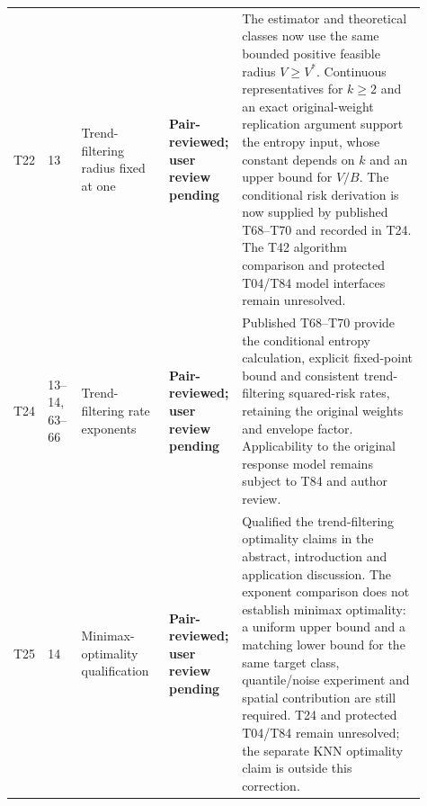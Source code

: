 \documentclass[10pt]{article}
\newcommand{\deferred}{\textcolor{deferredred}{\textbf{Deferred}}}
\newcommand{\pairreviewed}{\textcolor{deferredred}{\textbf{Pair-reviewed; user review pending}}}
\begin{document}
\begin{landscape}
\begin{longtable}{L{0.045\linewidth}L{0.08\linewidth}L{0.21\linewidth}L{0.13\linewidth}L{0.445\linewidth}}
T22 & 13 & Trend-filtering radius fixed at one & \pairreviewed &
\textcolor{deferredred}{The estimator and theoretical classes now use the same
bounded positive feasible radius $V\geq V^*$. Continuous representatives for
$k\geq2$ and an exact original-weight replication argument support the entropy
input, whose constant depends on $k$ and an upper bound for $V/B$.
The conditional risk derivation is now supplied by published T68--T70
and recorded in T24. The T42 algorithm comparison and protected
T04/T84 model interfaces remain unresolved.}\\
T24 & 13--14, 63--66 & Trend-filtering rate exponents &
\pairreviewed & \textcolor{deferredred}{Published T68--T70 provide the
conditional entropy calculation, explicit fixed-point bound and
consistent trend-filtering squared-risk rates, retaining the original
weights and envelope factor. Applicability to the original response
model remains subject to T84 and author review.}\\
T25 & 14 & Minimax-optimality qualification & \pairreviewed &
\textcolor{deferredred}{Qualified the trend-filtering optimality claims in the
abstract, introduction and application discussion. The exponent comparison
does not establish minimax optimality: a uniform upper bound and a matching
lower bound for the same target class, quantile/noise experiment and spatial
contribution are still required. T24 and protected T04/T84 remain unresolved;
the separate KNN optimality claim is outside this correction.}\\

\end{longtable}
\end{landscape}
\end{document}
